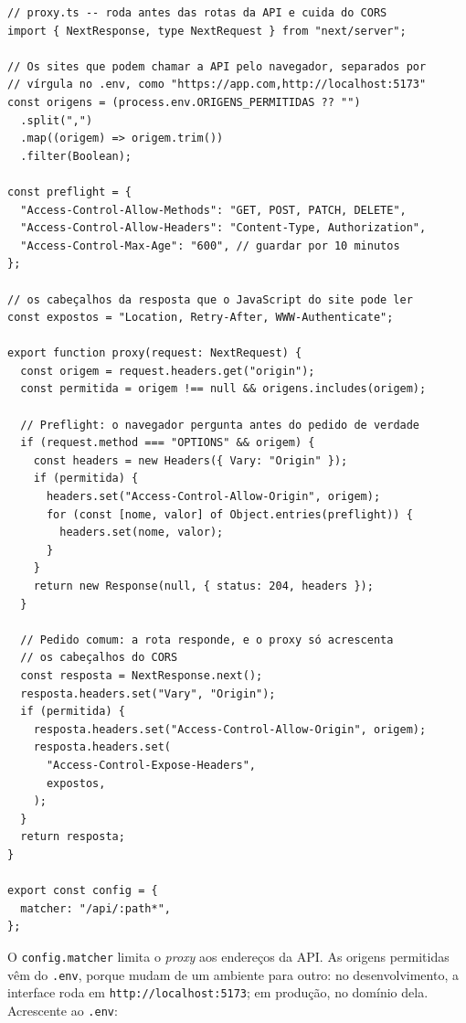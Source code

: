 \begin{codigo}
\begin{Verbatim}[breaklines=true, breaksymbolleft={}, fontsize=\footnotesize]
// proxy.ts -- roda antes das rotas da API e cuida do CORS
import { NextResponse, type NextRequest } from "next/server";

// Os sites que podem chamar a API pelo navegador, separados por
// vírgula no .env, como "https://app.com,http://localhost:5173"
const origens = (process.env.ORIGENS_PERMITIDAS ?? "")
  .split(",")
  .map((origem) => origem.trim())
  .filter(Boolean);

const preflight = {
  "Access-Control-Allow-Methods": "GET, POST, PATCH, DELETE",
  "Access-Control-Allow-Headers": "Content-Type, Authorization",
  "Access-Control-Max-Age": "600", // guardar por 10 minutos
};

// os cabeçalhos da resposta que o JavaScript do site pode ler
const expostos = "Location, Retry-After, WWW-Authenticate";

export function proxy(request: NextRequest) {
  const origem = request.headers.get("origin");
  const permitida = origem !== null && origens.includes(origem);

  // Preflight: o navegador pergunta antes do pedido de verdade
  if (request.method === "OPTIONS" && origem) {
    const headers = new Headers({ Vary: "Origin" });
    if (permitida) {
      headers.set("Access-Control-Allow-Origin", origem);
      for (const [nome, valor] of Object.entries(preflight)) {
        headers.set(nome, valor);
      }
    }
    return new Response(null, { status: 204, headers });
  }

  // Pedido comum: a rota responde, e o proxy só acrescenta
  // os cabeçalhos do CORS
  const resposta = NextResponse.next();
  resposta.headers.set("Vary", "Origin");
  if (permitida) {
    resposta.headers.set("Access-Control-Allow-Origin", origem);
    resposta.headers.set(
      "Access-Control-Expose-Headers",
      expostos,
    );
  }
  return resposta;
}

export const config = {
  matcher: "/api/:path*",
};
\end{Verbatim}
\end{codigo}

O \texttt{config.matcher} limita o \textit{proxy} aos endereços da API. As origens permitidas vêm do \texttt{.env}, porque mudam de um ambiente para outro: no desenvolvimento, a interface roda em \texttt{http://localhost:5173}; em produção, no domínio dela. Acrescente ao \texttt{.env}:

